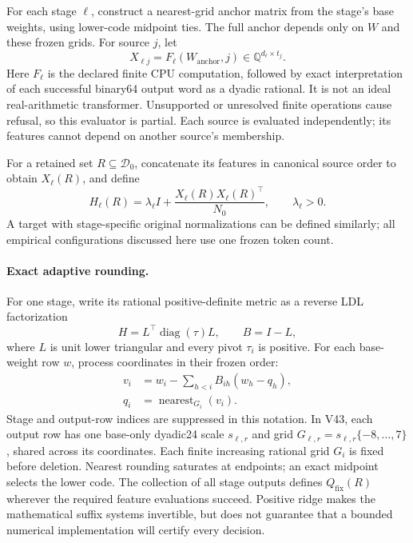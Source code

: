 \documentclass[10pt,twocolumn,letterpaper]{article}
\newcommand{\Q}{\mathbb{Q}}
\newcommand{\calD}{\mathcal{D}}
\newcommand{\Qfix}{Q_{\mathrm{fix}}}
\begin{document}
For each stage $\ell$, construct a nearest-grid anchor matrix from the stage's
base weights, using lower-code midpoint ties. The full anchor depends only on
$W$ and these frozen grids. For source $j$, let
\[
 X_{\ell j}=F_\ell(W_{\mathrm{anchor}},j)
       \in\Q^{d_\ell\times t_j}.
\]
Here $F_\ell$ is the declared finite CPU computation, followed by exact
interpretation of each successful binary64 output word as a dyadic rational.
It is not an ideal real-arithmetic transformer. Unsupported or unresolved finite
operations cause refusal, so this evaluator is partial. Each source is evaluated
independently; its features cannot depend on another source's membership.

For a retained set $R\subseteq\calD_0$, concatenate its features in canonical
source order to obtain $X_\ell(R)$, and define
\begin{equation}
 H_\ell(R)=\lambda_\ell I+
   \frac{X_\ell(R)X_\ell(R)^\top}{N_0},
 \qquad \lambda_\ell>0.
 \label{eq:metric}
\end{equation}
A target with stage-specific original normalizations can be defined similarly;
all empirical configurations discussed here use one frozen token count.

\paragraph{Exact adaptive rounding.}
For one stage, write its rational positive-definite metric as a reverse LDL
factorization
\[
 H=L^\top\operatorname{diag}(\tau)L,
 \qquad B=I-L,
\]
where $L$ is unit lower triangular and every pivot $\tau_i$ is positive. For each
base-weight row $w$, process coordinates in their frozen order:
\begin{align}
 v_i&=w_i-\sum_{h<i} B_{ih}(w_h-q_h),\label{eq:recurrence}\\
 q_i&=\operatorname{nearest}_{G_i}(v_i).
 \label{eq:rounding}
\end{align}
Stage and output-row indices are suppressed in this notation. In V43, each
output row has one base-only dyadic24 scale $s_{\ell,r}$ and grid
$G_{\ell,r}=s_{\ell,r}\{-8,\ldots,7\}$, shared across its coordinates.
Each finite increasing rational grid $G_i$ is fixed before deletion. Nearest
rounding saturates at endpoints; an exact midpoint selects the lower code. The
collection of all stage outputs defines $\Qfix(R)$ wherever the required feature
evaluations succeed. Positive ridge makes the mathematical suffix systems
invertible, but does not guarantee that a bounded numerical implementation will
certify every decision.
\end{document}
